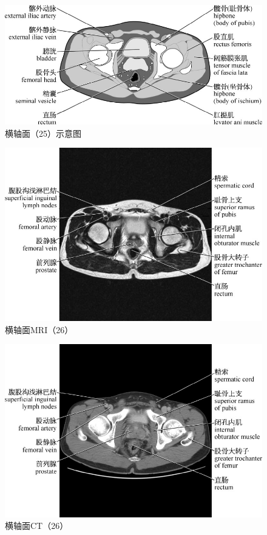 \begin{figure}[!htbp]
 \centering
 \includegraphics{./images/Image00076.jpg}
 \captionsetup{justification=centering}
 \caption{横轴面（25）示意图}
  \end{figure} 
 \FloatBarrier

\begin{figure}[!htbp]
 \centering
 \includegraphics{./images/Image00077.jpg}
 \captionsetup{justification=centering}
 \caption{横轴面MRI（26）}
  \end{figure} 
 \FloatBarrier

\begin{figure}[!htbp]
 \centering
 \includegraphics{./images/Image00078.jpg}
 \captionsetup{justification=centering}
 \caption{横轴面CT（26）}
  \end{figure} 
 \FloatBarrier

